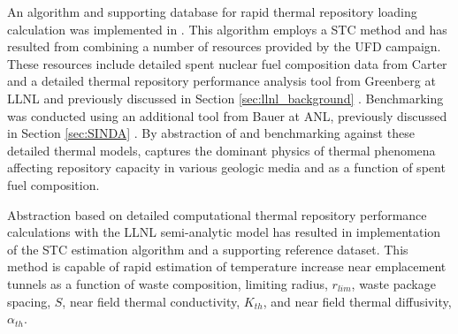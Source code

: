 
An algorithm and supporting database for rapid thermal repository loading 
calculation was implemented in \Cyder.  This algorithm employs a \gls{STC} 
method \cite{radel_effect_2007, radel_repository_2007} and has resulted from 
combining a number of resources provided by the \gls{UFD} campaign.  These 
resources include detailed spent nuclear fuel composition data from Carter 
\cite{carter_fuel_2011} and a detailed thermal repository performance analysis 
tool from Greenberg at \gls{LLNL} and previously discussed in Section 
\ref{sec:llnl_background} \cite{greenberg_application_2012}. 
Benchmarking was conducted using an additional tool from Bauer 
at \gls{ANL}, previously discussed in Section \ref{sec:SINDA} \cite{huff_numerical_2012}. By abstraction of and benchmarking against 
these detailed thermal models, \Cyder captures the dominant physics of thermal 
phenomena affecting repository capacity in various geologic media and as a 
function of spent fuel composition.

Abstraction based on detailed computational thermal repository performance 
calculations with the \gls{LLNL} semi-analytic model has resulted in implementation 
of the \gls{STC} estimation algorithm and a supporting reference dataset.  This 
method is capable of rapid estimation of temperature increase near emplacement 
tunnels as a function of waste composition, limiting radius, $r_{lim}$, waste 
package spacing, $S$, near field thermal conductivity, $K_{th}$, and near field 
thermal diffusivity, $\alpha_{th}$.
